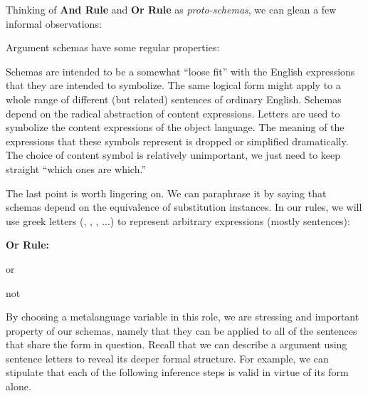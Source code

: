 Thinking of \textbf{And Rule} and \textbf{Or Rule} as \emph{proto-schemas}, we
can glean a few informal observations:

\begin{observation}
  \label{obs:argument-proto-schemas}
  Argument schemas have some regular properties:
  \begin{outline}[enumerate]
  \1 Schemas are intended to be a somewhat ``loose fit'' with the English
    expressions that they are intended to symbolize. The same logical form
    might apply to a whole range of different (but related) sentences of
    ordinary English.
    \1 Schemas depend on the radical abstraction of content expressions.
    \2 Letters are used to symbolize the content expressions of the object
    language.
    \2 The meaning of the expressions that these symbols represent is dropped or
    simplified dramatically.
    \1 The choice of content symbol is relatively unimportant, we just need to
    keep straight ``which ones are which.''
  \end{outline}
\end{observation}

The last point is worth lingering on. We can paraphrase it by saying that
schemas depend on the equivalence of substitution instances. In our rules, we
will use greek letters (\ephi, \epsi, \echi, ...) to represent arbitrary
expressions (mostly sentences):

 {
  \begin{argument}
  \item[ ] \textbf{Or Rule:}
  \item[ ] \sphi or \epsi
  \item[ ] not \ephi
  \item[\therefore] \epsi
  \end{argument}
}

By choosing a metalanguage variable in this role, we are stressing and important
property of our schemas, namely that they can be applied to all of the sentences
that share the form in question. Recall that we can describe a argument using
sentence letters to reveal its deeper formal structure. For example, we can
stipulate that each of the following inference steps is valid in virtue of its
form alone. \\

